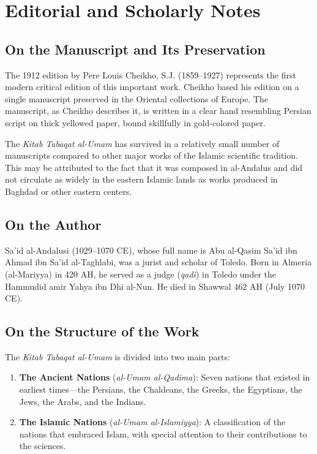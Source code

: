 \documentclass[11pt,a4paper]{article}
\begin{document}
\clearpage

\section*{Editorial and Scholarly Notes}

\subsection*{On the Manuscript and Its Preservation}

The 1912 edition by Pere Louis Cheikho, S.J. (1859--1927) represents the first modern critical edition of this important work. Cheikho based his edition on a single manuscript preserved in the Oriental collections of Europe. The manuscript, as Cheikho describes it, is written in a clear hand resembling Persian script on thick yellowed paper, bound skillfully in gold-colored paper.

The \textit{Kitab Tabaqat al-Umam} has survived in a relatively small number of manuscripts compared to other major works of the Islamic scientific tradition. This may be attributed to the fact that it was composed in al-Andalus and did not circulate as widely in the eastern Islamic lands as works produced in Baghdad or other eastern centers.

\subsection*{On the Author}

Sa'id al-Andalusi (1029--1070 CE), whose full name is Abu al-Qasim Sa'id ibn Ahmad ibn Sa'id al-Taghlabi, was a jurist and scholar of Toledo. Born in Almeria (al-Mariyya) in 420 AH, he served as a judge (\textit{qadi}) in Toledo under the Hammudid amir Yahya ibn Dhi al-Nun. He died in Shawwal 462 AH (July 1070 CE).

\subsection*{On the Structure of the Work}

The \textit{Kitab Tabaqat al-Umam} is divided into two main parts:

\begin{enumerate}
  \item \textbf{The Ancient Nations} (\textit{al-Umam al-Qadima}): Seven nations that existed in earliest times---the Persians, the Chaldeans, the Greeks, the Egyptians, the Jews, the Arabs, and the Indians.
  \item \textbf{The Islamic Nations} (\textit{al-Umam al-Islamiyya}): A classification of the nations that embraced Islam, with special attention to their contributions to the sciences.
\end{enumerate}
\end{document}
